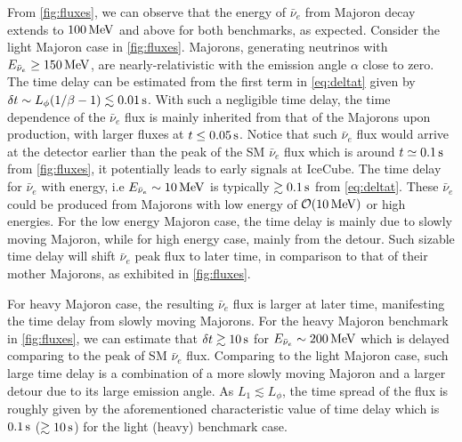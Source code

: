 From \cref{fig:fluxes}, we can observe that the energy of $\bar{\nu}_e$ from Majoron decay extends to $\unit[100]{MeV}$ and above for both benchmarks, as expected. 
Consider the light Majoron case in \cref{fig:fluxes}. Majorons, generating neutrinos with $E_{\bar{\nu}_e} \geq \unit[150]{MeV}$, are nearly-relativistic with the emission angle $\alpha$ close to zero. The time delay can be estimated from the first term in \cref{eq:deltat} given by $\delta t \sim L_\phi (1/\beta -1)\lesssim \unit[0.01]{s}$. With such a negligible time delay, the time dependence of the $\bar{\nu}_e$ flux is mainly inherited from that of the Majorons upon production, with larger fluxes at $t\leq \unit[0.05]{s}$. Notice that such $\bar{\nu}_e$ flux would arrive at the detector earlier than the peak of the SM $\bar{\nu}_e$ flux which is around $t\simeq \unit[0.1]{s}$ from \cref{fig:fluxes}, it potentially leads to early signals at IceCube.
The time delay for $\bar{\nu}_e$ with energy, i.e $E_{\bar{\nu}_{e}} \sim \unit[10]{MeV}$ is typically $\gtrsim \unit[0.1]{s}$ from \cref{eq:deltat}. These $\bar{\nu}_e$ could be produced from Majorons with low energy of $\mathcal{O}(\unit[10]{MeV})$ or high energies. For the low energy Majoron case, the time delay is mainly due to slowly moving Majoron, while for high energy case, mainly from the detour.
Such sizable time delay will shift $\bar{\nu}_e$ peak flux to later time, in comparison to that of their mother Majorons, as exhibited in \cref{fig:fluxes}.

For heavy Majoron case, the resulting $\bar{\nu}_e$ flux is larger at later time, manifesting the time delay from slowly moving Majorons. For the heavy Majoron benchmark in \cref{fig:fluxes}, we can estimate that $\delta t \gtrsim \unit[10]{s}$ for $E_{\bar{\nu}_{e}}\sim \unit[200]{MeV}$ which is delayed comparing to the peak of SM $\bar{\nu}_e$ flux. Comparing to the light Majoron case, such large time delay is a combination of a more slowly moving Majoron and a larger detour due to its large emission angle. As $L_1\lesssim L_\phi$, the time spread of the flux is roughly given by the aforementioned characteristic value of time delay which is $\unit[0.1]{s}$ ($\gtrsim\unit[10]{s}$) for the light (heavy) benchmark case.

